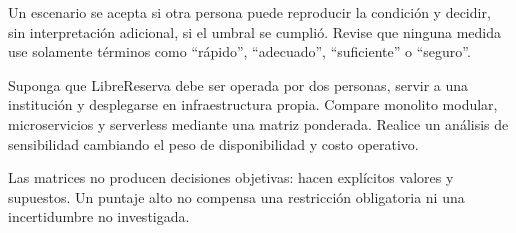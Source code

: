 \begin{validacion}
Un escenario se acepta si otra persona puede reproducir la condición y decidir, sin interpretación adicional, si el umbral se cumplió. Revise que ninguna medida use solamente términos como ``rápido'', ``adecuado'', ``suficiente'' o ``seguro''.
\end{validacion}

\begin{ejercicio}[title={Ejercicio de decisión}]
Suponga que LibreReserva debe ser operada por dos personas, servir a una institución y desplegarse en infraestructura propia. Compare monolito modular, microservicios y serverless mediante una matriz ponderada. Realice un análisis de sensibilidad cambiando el peso de disponibilidad y costo operativo.
\end{ejercicio}

\begin{riesgo}
Las matrices no producen decisiones objetivas: hacen explícitos valores y supuestos. Un puntaje alto no compensa una restricción obligatoria ni una incertidumbre no investigada.
\end{riesgo}
